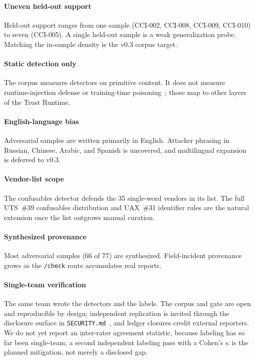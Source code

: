 \paragraph{Uneven held-out support} Held-out support ranges from one
sample (CCI-002, CCI-008, CCI-009, CCI-010) to seven (CCI-005). A
single held-out sample is a weak generalization probe. Matching the
in-sample density is the v0.3 corpus target.

\paragraph{Static detection only} The corpus measures detectors on
primitive content. It does not measure runtime-injection defense or
training-time poisoning~\cite{Carlini:2024:webcrawl-poisoning}; those map
to other layers of the Trust Runtime.

\paragraph{English-language bias} Adversarial samples are written
primarily in English. Attacker phrasing in Russian, Chinese, Arabic, and
Spanish is uncovered, and multilingual expansion is deferred to v0.3.

\paragraph{Vendor-list scope} The confusables detector defends the 35
single-word vendors in its list. The full UTS~\#39 confusables
distribution and UAX~\#31 identifier rules are the natural extension once
the list outgrows manual curation.

\paragraph{Synthesized provenance} Most adversarial samples (66 of 77)
are synthesized. Field-incident provenance grows as the \texttt{/check}
route accumulates real reports.

\paragraph{Single-team verification} The same team wrote the detectors
and the labels. The corpus and gate are open and reproducible by design;
independent replication is invited through the disclosure surface in
\texttt{SECURITY.md}~\cite{primitivehub:2026:security}, and ledger
closures credit external reporters. We do not yet report an inter-rater
agreement statistic, because labeling has so far been single-team; a
second independent labeling pass with a Cohen's $\kappa$ is the planned
mitigation, not merely a disclosed gap.

